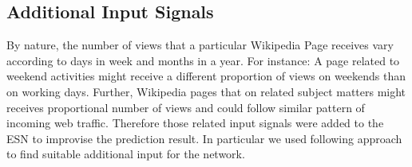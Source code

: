  \subsection{Additional Input Signals}

 
 \indent \indent
 By nature, the number of views that a particular Wikipedia Page receives vary according to  days in week and months in a year. For instance: A page related to weekend activities might receive a different proportion of views on weekends than on working days. Further, Wikipedia pages that on related subject matters might receives proportional number of views and could follow similar pattern of incoming web traffic. Therefore those related input signals were added to the ESN to improvise the prediction result. In particular we used following approach to find suitable additional input for the network. \\\\
 
